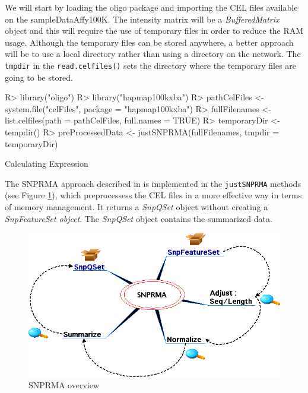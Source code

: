 \documentclass{article}
\newcommand{\Rfunction}[1]{{\texttt{#1}}}
\newcommand{\Rmethod}[1]{{\texttt{#1}}}
\newcommand{\Robject}[1]{{\texttt{#1}}}
\newcommand{\Rpackage}[1]{{\textsf{#1}}}
\newcommand{\Rclass}[1]{{\textit{#1}}}
\newcommand{\oligo}{\Rpackage{oligo }}
\begin{document}
We will start by loading the \oligo package and importing the CEL
files available on the \Rpackage{sampleDataAffy100K}. The intensity
matrix will be a \Rclass{BufferedMatrix} object and this will require
the use of temporary files in order to reduce the RAM usage. Although
the temporary files can be stored anywhere, a better approach will be
to use a local directory rather than using a directory on the
network. The \Robject{tmpdir} in the \Rfunction{read.celfiles()} sets
the directory where the temporary files are going to be stored.

\begin{Schunk}
\begin{Sinput}
R> library("oligo")
R> library("hapmap100kxba")
R> pathCelFiles <- system.file("celFiles", package = "hapmap100kxba")
R> fullFilenames <- list.celfiles(path = pathCelFiles, 
     full.names = TRUE)
R> temporaryDir <- tempdir()
R> preProcessedData <- justSNPRMA(fullFilenames, 
     tmpdir = temporaryDir)
\end{Sinput}
\begin{Soutput}
Calculating Expression
\end{Soutput}
\end{Schunk}

The SNPRMA approach described in \cite{Carvalho2006} is implemented in the
\Rmethod{justSNPRMA} methods (see Figure \ref{snprma}), which
preprocessess the CEL files in a more effective way in terms of memory
management. It returns a \Rclass{SnpQSet} object without creating a
\Rclass{SnpFeatureSet object}. The \Rclass{SnpQSet} object contains
the summarized data.

\begin{figure}[h]
  \centering
  \includegraphics[scale=.5]{snprma.png}
  \caption{SNPRMA overview}
  \label{snprma}
\end{figure}
\end{document}
